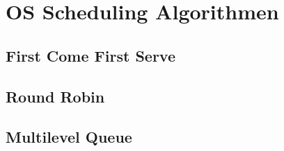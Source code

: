 \chapter{OS Scheduling Algorithmen}

\section{First Come First Serve}

\section{Round Robin}

\section{Multilevel Queue}